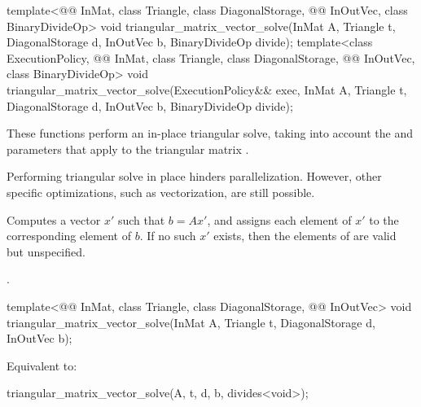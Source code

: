 %
\begin{itemdecl}
template<@@ InMat, class Triangle, class DiagonalStorage,
         @@ InOutVec, class BinaryDivideOp>
  void triangular_matrix_vector_solve(InMat A, Triangle t, DiagonalStorage d,
                                      InOutVec b, BinaryDivideOp divide);
template<class ExecutionPolicy, @@ InMat, class Triangle, class DiagonalStorage,
         @@ InOutVec, class BinaryDivideOp>
  void triangular_matrix_vector_solve(ExecutionPolicy&& exec,
                                      InMat A, Triangle t, DiagonalStorage d,
                                      InOutVec b, BinaryDivideOp divide);
\end{itemdecl}

\begin{itemdescr}
\pnum
These functions perform an in-place triangular solve,
taking into account the  and  parameters
that apply to the triangular matrix .
\begin{note}
Performing triangular solve in place hinders parallelization.
However, other  specific optimizations,
such as vectorization, are still possible.
\end{note}

\pnum
\effects
Computes a vector $x'$ such that $b = A x'$,
and assigns each element of $x'$ to the corresponding element of $b$.
If no such $x'$ exists,
then the elements of  are valid but unspecified.

\pnum
\complexity
{}.
\end{itemdescr}

%
\begin{itemdecl}
template<@@ InMat, class Triangle, class DiagonalStorage, @@ InOutVec>
  void triangular_matrix_vector_solve(InMat A, Triangle t, DiagonalStorage d, InOutVec b);
\end{itemdecl}

\begin{itemdescr}
\pnum
\effects
Equivalent to:
\begin{codeblock}
triangular_matrix_vector_solve(A, t, d, b, divides<void>{});
\end{codeblock}
\end{itemdescr}

